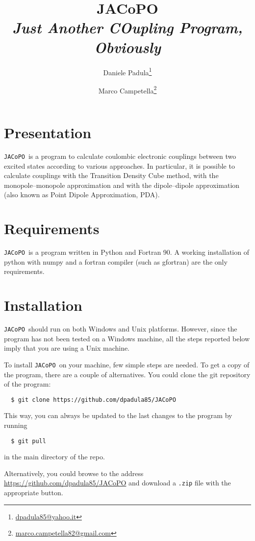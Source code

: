 \documentclass[a4paper]{article}
\title{JACoPO \\ \textit{Just Another COupling Program, Obviously}}
\author[1]{Daniele Padula\thanks{\href{mailto:dpadula85@yahoo.it}{dpadula85@yahoo.it}}}
\author[1]{Marco Campetella\thanks{\href{mailto:marco.campetella82@gmail.com}{marco.campetella82@gmail.com}}}
\affil[1]{\textit{Dipartimento di Chimica e Chimica Industriale, Universit\`a di Pisa, via G.~Moruzzi 13, 56124 Pisa, Italy}}
\newcommand{\jacopo}{\texttt{JACoPO}}
\begin{document}
\maketitle

\section{Presentation}

\jacopo\ is a program to calculate coulombic electronic couplings between two excited states according to various approaches.
In particular, it is possible to calculate couplings with the Transition Density Cube method, with the monopole--monopole approximation
and with the dipole--dipole approximation (also known as Point Dipole Approximation, PDA).

\section{Requirements}

\jacopo\ is a program written in Python and Fortran 90. A working installation of python with numpy and a fortran compiler (such as gfortran) are the only requirements.

\section{Installation}

\jacopo\ should run on both Windows and Unix platforms. However, since the program has not been tested on a Windows machine,
all the steps reported below imply that you are using a Unix machine.

To install \jacopo\ on your machine, few simple steps are needed.
To get a copy of the program, there are a couple of alternatives.
You could clone the git repository of the program:

\begin{verbatim}
  $ git clone https://github.com/dpadula85/JACoPO 
\end{verbatim}

This way, you can always be updated to the last changes to the program by running

\begin{verbatim}
  $ git pull 
\end{verbatim}

in the main directory of the repo.

Alternatively, you could browse to the address \url{https://github.com/dpadula85/JACoPO} and download a \verb|.zip| file with the appropriate button.
\end{document}
